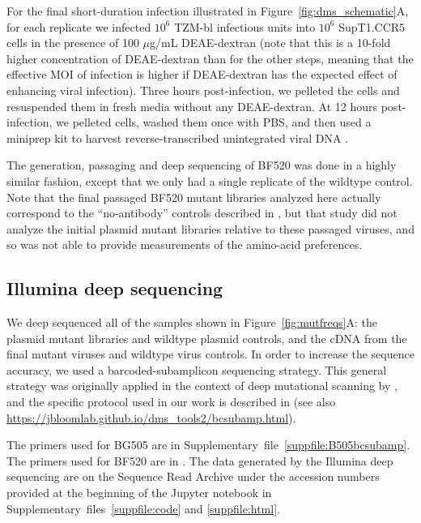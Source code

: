 \documentclass[9pt]{elife}
\begin{document}
For the final short-duration infection illustrated in Figure~\ref{fig:dms_schematic}A, for each replicate we infected $10^6$ TZM-bl infectious units into $10^6$ SupT1.CCR5 cells in the presence of 100 $\mu$g/mL DEAE-dextran (note that this is a 10-fold higher concentration of DEAE-dextran than for the other steps, meaning that the effective MOI of infection is higher if DEAE-dextran has the expected effect of enhancing viral infection).
Three hours post-infection, we pelleted the cells and resuspended them in fresh media without any DEAE-dextran.
At 12 hours post-infection, we pelleted cells, washed them once with PBS, and then used a miniprep kit to harvest reverse-transcribed unintegrated viral DNA \citep{haddox2016experimental}.

The generation, passaging and deep sequencing of BF520 was done in a highly similar fashion, except that we only had a single replicate of the wildtype control.
Note that the final passaged BF520 mutant libraries analyzed here actually correspond to the ``no-antibody'' controls described in \citet{dingens2017comprehensive}, but that study did not analyze the initial plasmid mutant libraries relative to these passaged viruses, and so was not able to provide measurements of the amino-acid preferences.

\subsection{Illumina deep sequencing}
We deep sequenced all of the samples shown in Figure~\ref{fig:mutfreqs}A: the plasmid mutant libraries and wildtype plasmid controls, and the cDNA from the final mutant viruses and wildtype virus controls.
In order to increase the sequence accuracy, we used a barcoded-subamplicon sequencing strategy.
This general strategy was originally applied in the context of deep mutational scanning by \citet{wu2014high}, and the specific protocol used in our work is described in \citet{doud2016accurate} (see also \url{https://jbloomlab.github.io/dms_tools2/bcsubamp.html}).

The primers used for BG505 are in Supplementary~file~\ref{suppfile:B505bcsubamp}.
The primers used for BF520 are in \citet{dingens2017comprehensive}.
The data generated by the Illumina deep sequencing are on the Sequence Read Archive under the accession numbers provided at the beginning of the Jupyter notebook in Supplementary~files~\ref{suppfile:code} and \ref{suppfile:html}.
\end{document}
